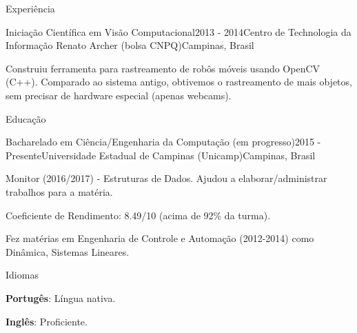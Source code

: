 \documentclass[8pt]{resume}
\newcommand{\tbf}[1]{\textbf{#1}}
\begin{document}
\begin{rSection}{Experiência}
\begin{rSubsection}{Iniciação Científica em Visão Computacional}{2013 - 2014}{Centro de Technologia da Informação Renato Archer (bolsa CNPQ)}{Campinas, Brasil}
    \item Construiu ferramenta para rastreamento
        de robôs móveis usando OpenCV (C++).
        Comparado ao sistema antigo, obtivemos o rastreamento de mais
        objetos, sem precisar de hardware especial (apenas webcams).
\end{rSubsection}

\end{rSection}

\begin{rSection}{Educação}

    \begin{rSubsection}{Bacharelado em Ciência/Engenharia da Computação (em progresso)}{2015 - Presente}{Universidade Estadual de Campinas (Unicamp)}{Campinas, Brasil}
    \item Monitor (2016/2017) - Estruturas de Dados.
        Ajudou a elaborar/administrar trabalhos para a matéria.
    \item Coeficiente de Rendimento: 8.49/10 (acima de 92\% da turma).
    \item Fez matérias em Engenharia de Controle e Automação (2012-2014)
        como Dinâmica, Sistemas Lineares.
\end{rSubsection}

\end{rSection}

\begin{rSection}{Idiomas}

\begin{rSubsection}{}{}{}{}
    \item \tbf{Portugês}: Língua nativa.
    \item \tbf{Inglês}: Proficiente.
\end{rSubsection}

\end{rSection}
\end{document}
